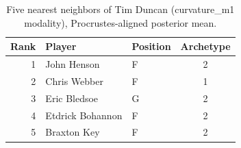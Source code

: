 \begin{table}[htbp]
  \centering\small
  \begin{tabular}{rllc}
    \toprule
    Rank & Player & Position & Archetype \\
    \midrule
    1 & John Henson & F & 2 \\
    2 & Chris Webber & F & 1 \\
    3 & Eric Bledsoe & G & 2 \\
    4 & Etdrick Bohannon & F & 2 \\
    5 & Braxton Key & F & 2 \\
    \bottomrule
  \end{tabular}
  \caption{Five nearest neighbors of Tim Duncan (curvature_m1 modality), Procrustes-aligned posterior mean.}
  \label{tab:Tim_Duncan_neighbors_curvature_m1}
\end{table}


